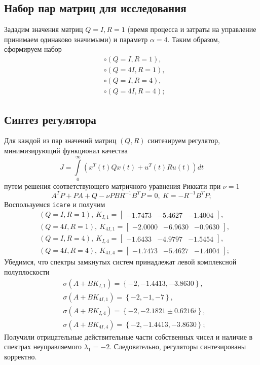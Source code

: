 \documentclass[a4paper, 12pt]{article}
\begin{document}
    \subsection{Набор пар матриц для исследования}
    Зададим значения матриц $Q=I,R=1$ (время процесса и затраты на управление принимаем одинаково значимыми) и параметр $\alpha=4$.
    Таким образом, сформируем набор
    \begin{align*}
        &\circ \left( Q=I, R=1 \right),\\
        &\circ \left( Q=4I, R=1 \right),\\
        &\circ \left( Q=I, R=4 \right),\\
        &\circ \left( Q=4I, R=4 \right);
    \end{align*}


    \subsection{Синтез регулятора}
    Для каждой из пар значений матриц $\left( Q,R \right)$ синтезируем
    регулятор, минимизирующий функционал качества
    $$
    J=\int\limits_{0}^{\infty}\left( x^T(t)Qx(t)+u^T(t)Ru(t) \right)dt
    $$
    путем решения соответствующего матричного уравнения Риккати при $\nu=1$
    $$
    A^TP+PA+Q-\nu PBR^{-1}B^TP=0,\ K=-R^{-1}B^TP;
    $$
    Воспользуемся \texttt{icare} и получим
    \begin{align*}
        &\left( Q=I, R=1 \right),\ K_{I,1}=\begin{bmatrix}
            -1.7473 &-5.4627 &-1.4004
        \end{bmatrix},\\
        &\left( Q=4I, R=1 \right),\ K_{4I,1}=\begin{bmatrix}
            -2.0000 &-6.9630 &-0.9630
        \end{bmatrix},\\
        &\left( Q=I, R=4 \right),\ K_{I,4}=\begin{bmatrix}
            -1.6433 &-4.9797 &-1.5454
        \end{bmatrix},\\
        &\left( Q=4I, R=4 \right),\ K_{4I,4}=\begin{bmatrix}
            -1.7473 &-5.4627 &-1.4004
        \end{bmatrix};
    \end{align*}
    Убедимся, что спектры замкнутых систем принадлежат левой комплексной полуплоскости
    \begin{align*}
        &\sigma\left( A+BK_{I,1} \right)=\left\{ -2,-1.4413,-3.8630 \right\},\\
        &\sigma\left( A+BK_{4I,1} \right)=\left\{ -2,-1,-7 \right\},\\
        &\sigma\left( A+BK_{I,4} \right)=\left\{ -2,-2.1821\pm0.6216i \right\},\\
        &\sigma\left( A+BK_{4I,4} \right)=\left\{ -2,-1.4413,-3.8630 \right\};
    \end{align*}
    Получили отрицательные действительные части собственных чисел и наличие в спектрах неуправляемого $\lambda_1=-2$.
    Следовательно, регуляторы синтезированы корректно.
\end{document}
